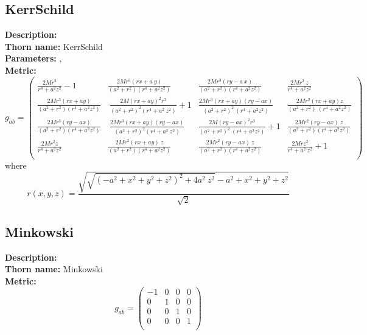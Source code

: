 \subsection{KerrSchild}
{\bf Description:}   \\
{\bf Thorn name:} KerrSchild \\
{\bf Parameters:} ,  \\
{\bf Metric:} \\
\begin{equation}
g_{ab} = 
\left(
\begin{array}{cccc}
 \frac{2 M r^3}{r^4+a^2 z^2}-1 & \frac{2 M r^3 (r x+a \
y)}{\left(a^2+r^2\right) \left(r^4+a^2 z^2\right)} & \frac{2 M r^3 (r y-a \
x)}{\left(a^2+r^2\right) \left(r^4+a^2 z^2\right)} & \frac{2 M r^2 \
z}{r^4+a^2 z^2} \\
 \frac{2 M r^3 (r x+a y)}{\left(a^2+r^2\right) \left(r^4+a^2 z^2\right)} & \
\frac{2 M (r x+a y)^2 r^3}{\left(a^2+r^2\right)^2 \left(r^4+a^2 \
z^2\right)}+1 & \frac{2 M r^3 (r x+a y) (r y-a x)}{\left(a^2+r^2\right)^2 \
\left(r^4+a^2 z^2\right)} & \frac{2 M r^2 (r x+a y) z}{\left(a^2+r^2\right) \
\left(r^4+a^2 z^2\right)} \\
 \frac{2 M r^3 (r y-a x)}{\left(a^2+r^2\right) \left(r^4+a^2 z^2\right)} & \
\frac{2 M r^3 (r x+a y) (r y-a x)}{\left(a^2+r^2\right)^2 \left(r^4+a^2 \
z^2\right)} & \frac{2 M (r y-a x)^2 r^3}{\left(a^2+r^2\right)^2 \
\left(r^4+a^2 z^2\right)}+1 & \frac{2 M r^2 (r y-a x) \
z}{\left(a^2+r^2\right) \left(r^4+a^2 z^2\right)} \\
 \frac{2 M r^2 z}{r^4+a^2 z^2} & \frac{2 M r^2 (r x+a y) \
z}{\left(a^2+r^2\right) \left(r^4+a^2 z^2\right)} & \frac{2 M r^2 (r y-a x) \
z}{\left(a^2+r^2\right) \left(r^4+a^2 z^2\right)} & \frac{2 M r z^2}{r^4+a^2 \
z^2}+1 \\
\end{array}
\right)
\end{equation}
where
\begin{equation}
r(x,y,z)=\frac{\sqrt{\sqrt{\left(-a^2+x^2+y^2+z^2\right)^2+4 a^2 \
z^2}-a^2+x^2+y^2+z^2}}{\sqrt{2}}
\end{equation}


\subsection{Minkowski}
{\bf Description:}   \\
{\bf Thorn name:} Minkowski \\
{\bf Metric:} \\
\begin{equation}
g_{ab} = 
\left(
\begin{array}{cccc}
 -1 & 0 & 0 & 0 \\
 0 & 1 & 0 & 0 \\
 0 & 0 & 1 & 0 \\
 0 & 0 & 0 & 1 \\
\end{array}
\right)
\end{equation}


